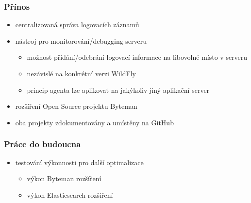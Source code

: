 \documentclass{beamer}
\begin{document}
\begin{frame}
	\frametitle{Přínos}
	\begin{itemize}
		\item centralizovaná správa logovacích záznamů
		\item nástroj pro monitorování/debugging serveru
		\begin{itemize}
			\item možnost přidání/odebrání logovací informace na libovolné místo v serveru
			\item nezávislé na konkrétní verzi WildFly
			\item princip agenta lze aplikovat na jakýkoliv jiný aplikační server
		\end{itemize}
		\item rozšíření Open Source projektu Byteman
		\item oba projekty zdokumentovány a umístěny na GitHub
	\end{itemize}
\end{frame}

\begin{frame}
	\frametitle{Práce do budoucna}
	\begin{itemize}
		\item testování výkonnosti pro další optimalizace
		\begin{itemize}
			\item výkon Byteman rozšíření
			\item výkon Elasticsearch rozšíření
		\end{itemize}
	\end{itemize}
	
\end{frame}

\end{document}
